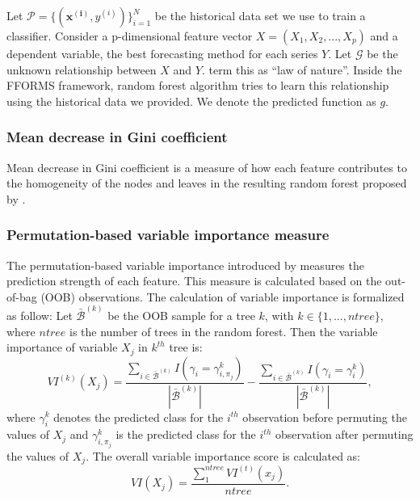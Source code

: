 \documentclass[11pt,a4paper,]{article}
\begin{document}
Let \(\mathcal{P}=\{(\mathbf{x^{(i)}}, y^{(i)})\}_{i=1}^{N}\) be the
historical data set we use to train a classifier. Consider a
p-dimensional feature vector \(X=(X_1, X_2, ..., X_p)\) and a dependent
variable, the best forecasting method for each series \(Y\). Let \(\mathcal{G}\) be the unknown relationship between \(X\) and
\(Y\). \textcite{Zhao} term this as ``law of nature''. Inside the FFORMS framework, random forest algorithm tries to learn this relationship using
the historical data we provided. We denote the predicted function as
\(g\).

\hypertarget{mean-decrease-in-gini-coefficient}{%
\subsubsection{Mean decrease in Gini coefficient}\label{mean-decrease-in-gini-coefficient}}

Mean decrease in Gini coefficient is a measure of how each feature contributes to the homogeneity of the nodes and leaves in the resulting random forest proposed by \textcite{breiman2001random}.

\hypertarget{permutation-based-variable-importance-measure}{%
\subsubsection{Permutation-based variable importance measure}\label{permutation-based-variable-importance-measure}}

The permutation-based variable importance introduced by \textcite{breiman2001random} measures the prediction
strength of each feature. This measure is calculated based on the out-of-bag (OOB) observations. The calculation of variable importance is formalized as follow: Let \(\bar{\mathcal{B}}^{(k)}\) be the OOB sample for a tree \(k\), with \(k\in \{1,...,ntree\}\), where \(ntree\) is the number of trees in the random forest. Then the variable importance of variable \(X_{j}\) in \(k^{th}\) tree is:
\[VI^{(k)}(X_{j})=\frac{\sum_{i\in \bar{\mathcal{B}}^{(k)}}I(\gamma_{i}=\gamma_{i,\pi_{j}}^{k})}{|\bar{\mathcal{B}}^{(k)}|}-\frac{\sum_{i\in \bar{\mathcal{B}}^{(k)}}I(\gamma_{i}=\gamma_{i}^{k})}{|\bar{\mathcal{B}}^{(k)}|},\]
where \(\gamma_{i}^{k}\) denotes the predicted class for the \(i^{th}\) observation before permuting the values of \(X_{j}\) and \(\gamma_{i, \pi_{j}}^{k}\) is the predicted class for the \(i^{th}\) observation after permuting the values of \(X_{j}\). The overall variable importance score is calculated as:
\[VI(X_{j})=\frac{\sum_{1}^{ntree}VI^{(t)}(x_{j})}{ntree}.\]
\end{document}
